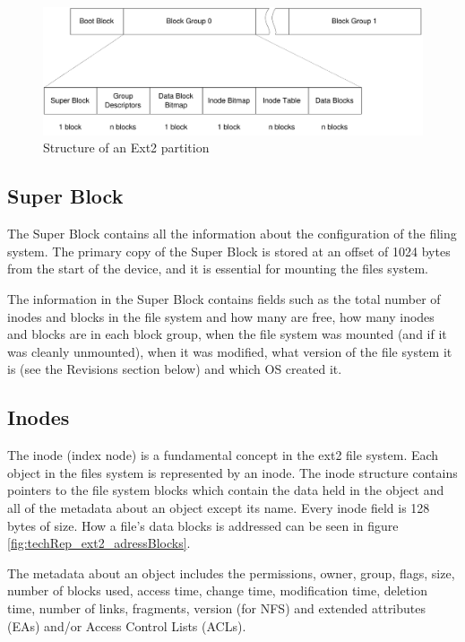 \begin{figure}[H]
\begin{center}
\includegraphics[width=\linewidth]{./files/inc/pic/techRep_ext2_partitionLayout}
\caption{\label{fig:techRep_ext2_partitionLayout}Structure of an Ext2 partition}
\end{center}
\end{figure}

\subsection{Super Block}
The Super Block contains all the information about the configuration of the filing system.  The primary copy of the Super Block is stored at an offset of 1024 bytes from the start of the device, and it is essential for mounting the files system.

The information in the Super Block contains fields such as the total number of inodes and blocks in the file system and how many are free, how many inodes and blocks are in each block group, when the file system was mounted (and if it was cleanly unmounted), when it was modified, what version of the file system it is (see the Revisions section below) and which OS created it.

\subsection{Inodes}
The inode (index node) is a fundamental concept in the ext2 file system. Each object in the files system is represented by an inode.  The inode structure contains pointers to the file system blocks which contain the data held in the object and all of the metadata about an object except its name. Every inode field is 128 bytes of size. How a file's data blocks is addressed can be seen in figure \ref{fig:techRep_ext2_adressBlocks}.

The metadata about an object includes the permissions, owner, group, flags, size, number of blocks used, access time, change time, modification time, deletion time, number of links, fragments, version (for NFS) and extended attributes (EAs) and/or Access Control Lists (ACLs).


